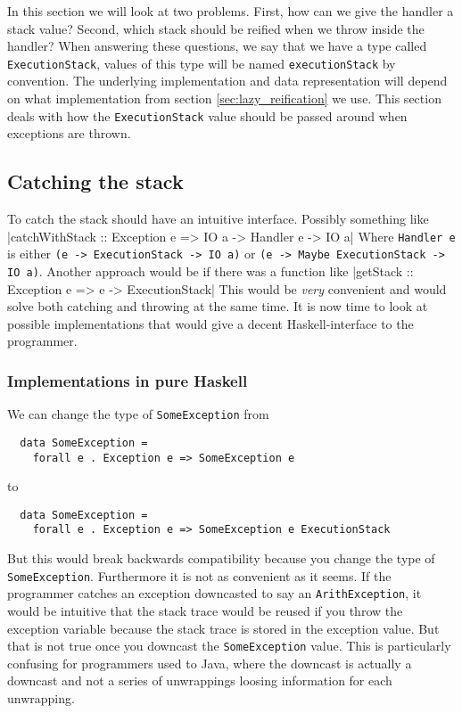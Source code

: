 In this section we will look at two problems. First, how can we give
the handler a stack value? Second, which stack should be reified
when we throw inside the handler? When answering these questions, we
say that we have a type called \texttt{ExecutionStack}, values of
this type will be named \texttt{executionStack} by convention. The
underlying implementation and data representation will depend on what
implementation from section \ref{sec:lazy_reification} we use. This section
deals with how the \texttt{ExecutionStack} value should be passed around
when exceptions are thrown.

\subsection{Catching the stack}

To catch the stack should have an intuitive interface. Possibly
something like
|catchWithStack :: Exception e => IO a -> Handler e -> IO a|
Where \texttt{Handler e} is either \texttt{(e -> ExecutionStack -> IO a)} or
\texttt{(e -> Maybe ExecutionStack -> IO a)}. Another approach would be
if there was a function like
|getStack :: Exception e => e -> ExecutionStack|
This would be \emph{very} convenient and would solve both catching and
throwing at the same time. It is now time to look at possible
implementations
that would give a decent Haskell-interface to the programmer.

\subsubsection{Implementations in pure Haskell}

We can change the type of \texttt{SomeException} from

\begin{verbatim}
  data SomeException =
    forall e . Exception e => SomeException e
\end{verbatim}

to

\begin{verbatim}
  data SomeException =
    forall e . Exception e => SomeException e ExecutionStack
\end{verbatim}

But this would break backwards compatibility because you change the type
of \texttt{SomeException}. Furthermore it is not as convenient as it
seems. If the programmer catches an exception downcasted to say an
\texttt{ArithException}, it would be intuitive that the stack trace
would be reused if you throw the exception variable because the stack
trace is stored in the exception value. But that is not true once you
downcast the \texttt{SomeException} value. This is particularly confusing for
programmers used to Java, where the downcast is actually a downcast and
not a series of unwrappings loosing information for each unwrapping.

